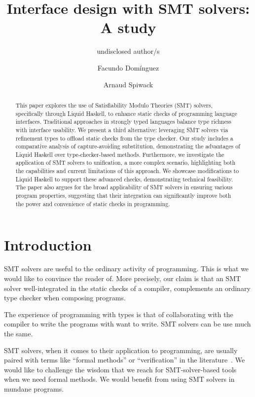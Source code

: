 \documentclass[sigconf, anonymous, review]{acmart}
\title{Interface design with SMT solvers: A study}
\author{undisclosed author/s}
\author{Facundo Domínguez}
\affiliation{
     \institution{Tweag}
     \country{Uruguay}
}
\author{Arnaud Spiwack}
\affiliation{
     \institution{Tweag}
     \country{France}
}
\begin{document}
\begin{abstract}
    This paper explores the use of Satisfiability Modulo Theories (SMT) solvers,
    specifically through Liquid Haskell, to enhance static checks of
    programming language interfaces. Traditional approaches in strongly typed
    languages balance type richness with interface usability. We present a
    third alternative: leveraging SMT solvers via refinement types to offload
    static checks from the type checker. Our study includes a comparative
    analysis of capture-avoiding substitution, demonstrating the advantages of
    Liquid Haskell over type-checker-based methods. Furthermore, we investigate
    the application of SMT solvers to unification, a more complex scenario,
    highlighting both the capabilities and current limitations of this
    approach. We showcase modifications to Liquid Haskell to support these
    advanced checks, demonstrating technical feasibility. The paper also
    argues for the broad applicability of SMT solvers in ensuring various
    program properties, suggesting that their integration can significantly
    improve both the power and convenience of static checks in programming.
\end{abstract}
\maketitle

\section{Introduction}

SMT solvers are useful to the ordinary activity of
programming. This is what we would like to convince the reader of. More
precisely, our claim is that an SMT solver well-integrated in the static checks
of a compiler, complements an ordinary type checker when composing programs.

The experience of programming with types is that of collaborating with the
compiler to write the programs with want to write. SMT solvers can be use much
the same.

SMT solvers, when it comes to their application to programming, are usually
paired with terms like ``formal methods'' or ``verification'' in the
literature~\cite{barnett05,demoura08,zinzin17,swamy22}. We would like to
challenge the wisdom that we reach for SMT-solver-based tools when we need
formal methods. We would benefit from using SMT solvers in mundane programs.
\end{document}
